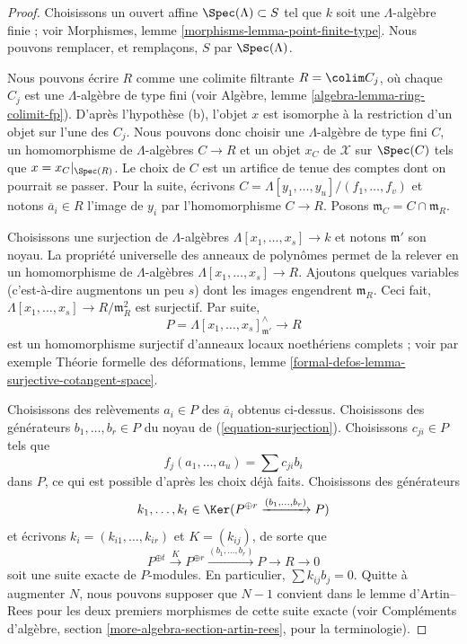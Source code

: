 \begin{proof}
Choisissons un ouvert affine $\Spec(\Lambda) \subset S$ tel que $k$ soit une
$\Lambda$-algèbre finie ; voir Morphismes, lemme
\ref{morphisms-lemma-point-finite-type}. Nous pouvons remplacer, et remplaçons,
$S$ par $\Spec(\Lambda)$.

\medskip\noindent
Nous pouvons écrire $R$ comme une colimite filtrante $R = \colim C_j$, où
chaque $C_j$ est une $\Lambda$-algèbre de type fini (voir Algèbre, lemme
\ref{algebra-lemma-ring-colimit-fp}). D'après l'hypothèse (b), l'objet $x$ est
isomorphe à la restriction d'un objet sur l'une des $C_j$. Nous pouvons donc
choisir une $\Lambda$-algèbre de type fini $C$, un homomorphisme de
$\Lambda$-algèbres $C \to R$ et un objet $x_C$ de $\mathcal{X}$ sur
$\Spec(C)$ tels que $x = x_C|_{\Spec(R)}$. Le choix de $C$ est un artifice de
tenue des comptes dont on pourrait se passer. Pour la suite, écrivons
$C = \Lambda[y_1, \ldots, y_u]/(f_1, \ldots, f_v)$ et notons
$\overline{a}_i \in R$ l'image de $y_i$ par l'homomorphisme $C \to R$.
Posons $\mathfrak m_C = C \cap \mathfrak m_R$.

\medskip\noindent
Choisissons une surjection de $\Lambda$-algèbres
$\Lambda[x_1, \ldots, x_s] \to k$ et notons $\mathfrak m'$ son noyau.
La propriété universelle des anneaux de polynômes permet de la relever en un
homomorphisme de $\Lambda$-algèbres
$\Lambda[x_1, \ldots, x_s] \to R$. Ajoutons quelques variables (c'est-à-dire
augmentons un peu $s$) dont les images engendrent $\mathfrak m_R$. Ceci fait,
$\Lambda[x_1, \ldots, x_s] \to R/\mathfrak m_R^2$ est surjectif. Par suite,
\begin{equation}
\label{equation-surjection}
P = \Lambda[x_1, \ldots, x_s]_{\mathfrak m'}^\wedge \longrightarrow R
\end{equation}
est un homomorphisme surjectif d'anneaux locaux noethériens complets ; voir par
exemple Théorie formelle des déformations, lemme
\ref{formal-defos-lemma-surjective-cotangent-space}.

\medskip\noindent
Choisissons des relèvements $a_i \in P$ des $\overline{a}_i$ obtenus
ci-dessus. Choisissons des générateurs $b_1, \ldots, b_r \in P$ du noyau de
(\ref{equation-surjection}). Choisissons $c_{ji} \in P$ tels que
$$
f_j(a_1, \ldots, a_u) = \sum c_{ji} b_i
$$
dans $P$, ce qui est possible d'après les choix déjà faits. Choisissons des
générateurs
$$
k_1, \ldots, k_t \in
\Ker(P^{\oplus r} \xrightarrow{(b_1, \ldots, b_r)} P)
$$
et écrivons $k_i = (k_{i1}, \ldots, k_{ir})$ et $K = (k_{ij})$, de sorte que
$$
P^{\oplus t} \xrightarrow{K}
P^{\oplus r} \xrightarrow{(b_1, \ldots, b_r)}
P \to R \to 0
$$
soit une suite exacte de $P$-modules. En particulier,
$\sum k_{ij} b_j = 0$. Quitte à augmenter $N$, nous pouvons supposer que
$N - 1$ convient dans le lemme d'Artin--Rees pour les deux premiers
morphismes de cette suite exacte (voir Compléments d'algèbre, section
\ref{more-algebra-section-artin-rees}, pour la terminologie).


\end{proof}
